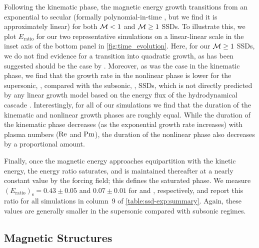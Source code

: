 Following the kinematic phase, the magnetic energy growth transitions from an exponential to secular (formally polynomial-in-time \citep{beresnyak2012universal, cho2009growth}, but we find it is approximately linear) for both $\mathcal{M} <1$ and $\mathcal{M} \geq 1$ SSDs. To illustrate this, we plot $E_\mathrm{ratio}$ for our two representative simulations on a linear-linear scale in the inset axis of the bottom panel in \autoref{fig:time_evolution}. Here, for our $\mathcal{M} \geq 1$ SSDs, we do not find evidence for a transition into quadratic growth, as has been suggested should be the case by \citet{Schleicher2013_quadratic_growth}. Moreover, as was the case in the kinematic phase, we find that the growth rate in the nonlinear phase is lower for the supersonic, \ie {}, compared with the subsonic, \ie {}, SSDs, which is not directly predicted by any linear growth model based on the energy flux of the hydrodynamical cascade \citep[e.g.,][]{Xu2016_dynamo,StOnge2020_weakly_collisional_dynamo,beattie2023bulk}. Interestingly, for all of our simulations we find that the duration of the kinematic and nonlinear growth phases are roughly equal. While the duration of the kinematic phase decreases (as the exponential growth rate increases) with plasma numbers (\ie $\mathrm{Re}$ and $\mathrm{Pm}$), the duration of the nonlinear phase also decreases by a proportional amount.

Finally, once the magnetic energy approaches equipartition with the kinetic energy, the energy ratio saturates, and is maintained thereafter at a nearly constant value by the forcing field; this defines the saturated phase. We measure $(E_\mathrm{ratio})_\mathrm{s} = 0.43 \pm 0.05$ and $0.07 \pm 0.01$ for  and , respectively, and report this ratio for all simulations in column~9 of \autoref{table:ssd-exp:summary}. Again, these values are generally smaller in the supersonic compared with subsonic regimes.

\subsection{Magnetic Structures}
\label{sec:results:field_slices}


